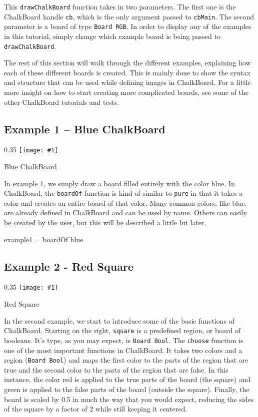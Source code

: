 \documentclass{article}
\newcommand{\floatimg}[3]{%
\begin{floatingfigure}[r]{0.35\textwidth} 
\texttt{[image: \#1]}
\caption{#2}\label{#3}
\end{floatingfigure}}
\begin{document}
This \texttt{drawChalkBoard} function takes in two parameters. The
first one is the ChalkBoard handle \texttt{cb}, which is the only
argument passed to \texttt{cbMain}. The second parameter is a board of
type \texttt{Board RGB}. In order to display any of the examples in
this tutorial, simply change which example board is being passed to
\texttt{drawChalkBoard}.


The rest of this section will walk through the different examples,
explaining how each of these different boards is created. This is
mainly done to show the syntax and structure that can be used while
defining images in ChalkBoard. For a little more insight on how to
start creating more complicated boards, see some of the other
ChalkBoard tutorials and tests.

\newpage
\subsection{Example 1 -- Blue ChalkBoard}

\floatimg{ex1.png}{Blue ChalkBoard}{fig:ex1}%
In example 1, we simply draw a board filled entirely with the
color blue. In ChalkBoard, the \texttt{boardOf} function is kind of
similar to \texttt{pure} in that it takes a color and creates an
entire board of that color. Many common colors, like blue, are already
defined in ChalkBoard and can be used by name. Others can easily be
created by the user, but this will be described a little bit later.

\vspace{1in}
\begin{DSL}
example1 = boardOf blue
\end{DSL}


\newpage
\subsection{Example 2 - Red Square}

\floatimg{ex2.png}{Red Square}{fig:ex2}%
In the second example, we start to introduce some of the basic
functions of ChalkBoard. Starting on the right, \texttt{square} is a
predefined region, or board of booleans. It's type, as you may expect,
is \texttt{Board Bool}. The \texttt{choose} function is one of the
most important functions in ChalkBoard. It takes two colors and a
region (\texttt{Board Bool}) and maps the first color to the parts of
the region that are true and the second color to the parts of the
region that are false. In this instance, the color red is applied to
the true parts of the board (the square) and green
is applied to the false parts of the board (outside the
square). Finally, the board is scaled by 0.5 in much the way that you
would expect, reducing the sides of the square by a factor of 2 while
still keeping it centered.
\end{document}
